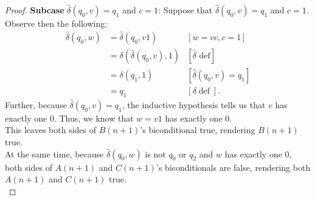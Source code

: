 \documentclass[10pt]{article}
\begin{document}
\begin{enumerate}[label={}]
\begin{proof}
                  \textbf{Subcase }$\hat{\delta}\left(q_0, v\right)=q_1$ and $c=1$: Suppose that $\hat{\delta}\left(q_0, v\right)=q_1$ and $c=1$. Observe then the following:
                  $$
                        \begin{aligned}
                              \hat{\delta}\left(q_0, w\right) & =\hat{\delta}\left(q_0, v 1\right)                    & {[w=v c, c=1] }                                     \\
                                                              & =\delta\left(\hat{\delta}\left(q_0, v\right),1\right) & {[\hat{\delta} \text { def}] }                      \\
                                                              & =\delta\left(q_1, 1\right)                            & {\left[\hat{\delta}\left(q_0, v\right)=q_1\right] } \\
                                                              & =q_1                                                  & {[\delta \operatorname{def}] . }
                        \end{aligned}
                  $$
                  Further, because $\hat{\delta}\left(q_0, v\right)=q_1$, the inductive hypothesis tells us that $v$ has exactly one 0. Thus, we know that $w=v1$ has exactly one 0.\\
                  This leaves both sides of $B(n+1)$'s biconditional true, rendering $B(n+1)$ true.\\
                  At the same time, because $\hat{\delta}\left(q_0, w\right)$ is not $q_0$ or $q_2$ and $w$ has exactly one 0, both sides of $A(n+1)$ and $C(n+1)$'s biconditionals are false, rendering both $A(n+1)$ and $C(n+1)$ true.\\


\end{proof}
\end{enumerate}
\end{document}
